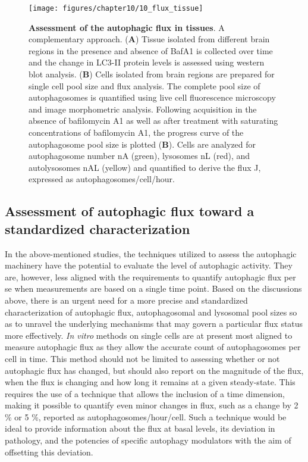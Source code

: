 \begin{figure}[!htbp]
  \texttt{[image: figures/chapter10/10\_flux\_tissue]}
  \caption[Assessment of the autophagic flux in tissues.]{\textbf{Assessment of the autophagic flux in tissues}. A complementary approach. (\textbf{A}) Tissue isolated from different brain regions in the presence and absence of BafA1 is collected over time and the change in LC3-II protein levels is assessed using western blot analysis. (\textbf{B}) Cells isolated from brain regions are prepared for single cell pool size and flux analysis. The complete pool size of autophagosomes is quantified using live cell fluorescence microscopy and image morphometric analysis. Following acquisition in the absence of bafilomycin A1 as well as after treatment with saturating concentrations of bafilomycin A1, the progress curve of the autophagosome pool size is plotted (\textbf{B}). Cells are analyzed for autophagosome number nA (green), lysosomes nL (red), and autolysosomes nAL (yellow) and quantified to derive the flux J, expressed as autophagosomes/cell/hour.}
  \label{fig:10_flux_tissue}
\end{figure}

\subsection{Assessment of autophagic flux  toward a standardized characterization}
In the above-mentioned studies, the techniques utilized to assess the autophagic machinery have the potential to evaluate the level of autophagic activity. They are, however, less aligned with the requirements to quantify autophagic flux per se when measurements are based on a single time point. Based on the discussions above, there is an urgent need for a more precise and standardized characterization of autophagic flux, autophagosomal and lysosomal pool sizes so as to unravel the underlying mechanisms that may govern a particular flux status more effectively. \textit{In vitro} methods on single cells are at present most aligned to measure autophagic flux as they allow the accurate count of autophagosomes per cell in time. This method should not be limited to assessing whether or not autophagic flux has changed, but should also report on the magnitude of the flux, when the flux is changing and how long it remains at a given steady-state. This requires the use of a technique that allows the inclusion of a time dimension, making it possible to quantify even minor changes in flux, such as a change by 2 \% or 5 \%, reported as autophagosomes/hour/cell. Such a technique would be ideal to provide information about the flux at basal levels, its deviation in pathology, and the potencies of specific autophagy modulators with the aim of offsetting this deviation. 

